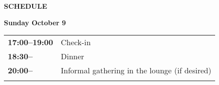 \documentclass[11pt]{article}
\newcommand{\scheduletablewidth}{5.06in}
\begin{document}
\medskip

\begin{center}
{\bf SCHEDULE }
\end{center}

\noindent\begin{minipage}{\textwidth}
\begin{center} {\bf\large Sunday October 9} \end{center}
\begin{tabular}{ p{0.9in} p{\scheduletablewidth} }
{\bf 17:00--19:00}
  & Check-in
\\
{\bf 18:30--} & Dinner\\
  {\bf 20:00--} & Informal gathering 
in the lounge
(if desired)
  \\
  \\
\end{tabular}
\end{minipage}
\end{document}
